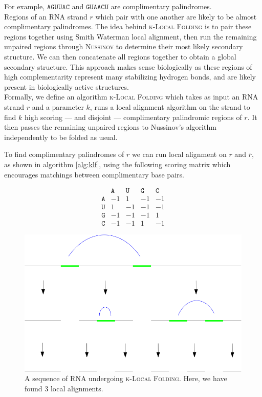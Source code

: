 \documentclass[11pt]{article}
\newcommand{\A}{\texttt{A}}
\newcommand{\G}{\texttt{G}}
\newcommand{\U}{\texttt{U}}
\newcommand{\C}{\texttt{C}}
\newcommand{\klf}{\textsc{k-Local Folding}\xspace}
\newcommand{\rf}{\textsc{Nussinov}\xspace}
\begin{document}
For example, $\A\G\U\U\A\C$ and $\G\U\A\A\C\U$ are complimentary palindromes. \\

Regions of an RNA strand $r$ which pair with one another are likely to be almost complimentary palindromes. The idea behind \klf is to pair these regions together using Smith Waterman local alignment, then run the remaining unpaired regions through \rf to determine their most likely secondary structure. We can then concatenate all regions together to obtain a global secondary structure. This approach makes sense biologically as these regions of high complementarity represent many stabilizing hydrogen bonds, and are likely present in biologically active structures.\\


Formally, we define an algorithm \klf which takes as input an RNA strand $r$ and a parameter $k$, runs a local alignment algorithm on the strand to find $k$ high scoring — and disjoint — complimentary palindromic regions of $r$. It then passes the remaining unpaired regions to Nussinov's algorithm independently to be folded as usual.


To find complimentary palindromes of $r$ we can run local alignment on $r$ and $\overline{r}$, as shown in algorithm \ref*{alg:klf}, using the following scoring matrix which encourages matchings between complimentary base pairs. 

\[\begin{array}{ccccc}
& \A & \U & \G & \C\\
\A & -1 & 1 & -1 & -1 \\
\U & 1 & -1 & -1 & -1 \\
\G & -1 & -1 & -1 & 1\\
\C & -1 & -1 & 1 & -1 
\end{array}\]

\begin{figure}[t]
\centering
\includegraphics[scale=0.4]{images/k_local_sequence.png}
\caption{A sequence of RNA undergoing \klf. Here, we have found 3 local alignments. }
\end{figure}
\end{document}
